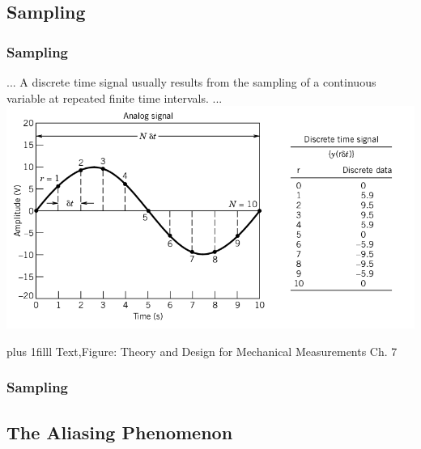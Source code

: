 \documentclass[fleqn]{beamer} %
\newcommand{\sectionIIIsubsectionItitle}{Sampling}
\newcommand{\sectionIIIsubsectionIItitle}{The Aliasing Phenomenon}
\newcommand{\btVFill}{\vskip0pt plus 1filll}
\begin{document}
		\subsection{\sectionIIIsubsectionItitle}\label{sectionIIIsubsectionI}

			\begin{frame}
				\frametitle{\sectionIIIsubsectionItitle}

				\bigskip
						...
				A discrete time signal usually
				results from the sampling of a continuous variable at repeated finite time intervals.
				...	
				\includegraphics[scale=.3]{images/sampling_fig7_1.png}
			
				\btVFill
				\tiny{Text,Figure: Theory and Design for Mechanical Measurements Ch. 7}

			\end{frame}

			\begin{frame}
				\frametitle{\sectionIIIsubsectionItitle}
		
			\end{frame}

		\subsection{\sectionIIIsubsectionIItitle}\label{sectionIIIsubsectionII}	
\end{document}
